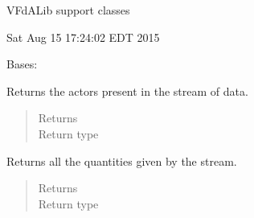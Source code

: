 \documentclass[letterpaper,10pt,openany,oneside,english]{sphinxmanual}
\begin{document}
VFdALib support classes

Sat Aug 15 17:24:02 EDT 2015

\begin{fulllineitems}
\label{\detokenize{support_rst/stream:stream.Stream}}
Bases: 

\begin{fulllineitems}
\label{\detokenize{support_rst/stream:stream.Stream.GetActors}}
Returns the actors present in the stream of data.
\begin{quote}\begin{description}
\item[{Returns}] \leavevmode
{}

\item[{Return type}] \leavevmode
{}

\end{description}\end{quote}

\end{fulllineitems}


\begin{fulllineitems}
\label{\detokenize{support_rst/stream:stream.Stream.GetQuantities}}
Returns all the quantities given by the stream.
\begin{quote}\begin{description}
\item[{Returns}] \leavevmode
{}

\item[{Return type}] \leavevmode
{}

\end{description}\end{quote}


\end{fulllineitems}
\end{fulllineitems}
\end{document}
